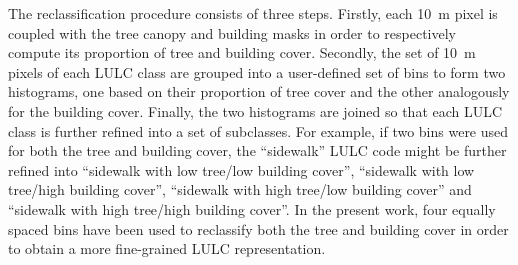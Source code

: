 \documentclass[12pt]{iopart}
\begin{document}
The reclassification procedure consists of three steps.
Firstly, each 10~m pixel is coupled with the tree canopy and building masks in order to respectively compute its proportion of tree and building cover.
Secondly, the set of 10~m pixels of each LULC class are grouped into a user-defined set of bins to form two histograms, one based on their proportion of tree cover and the other analogously for the building cover.
Finally, the two histograms are joined so that each LULC class is further refined into a set of subclasses. For example, if two bins were used for both the tree and building cover, the ``sidewalk'' LULC code might be further refined into ``sidewalk with low tree/low building cover'', ``sidewalk with low tree/high building cover'', ``sidewalk with high tree/low building cover'' and ``sidewalk with high tree/high building cover''.
In the present work, four equally spaced bins have been used to reclassify both the tree and building cover in order to obtain a more fine-grained LULC representation.
\end{document}
